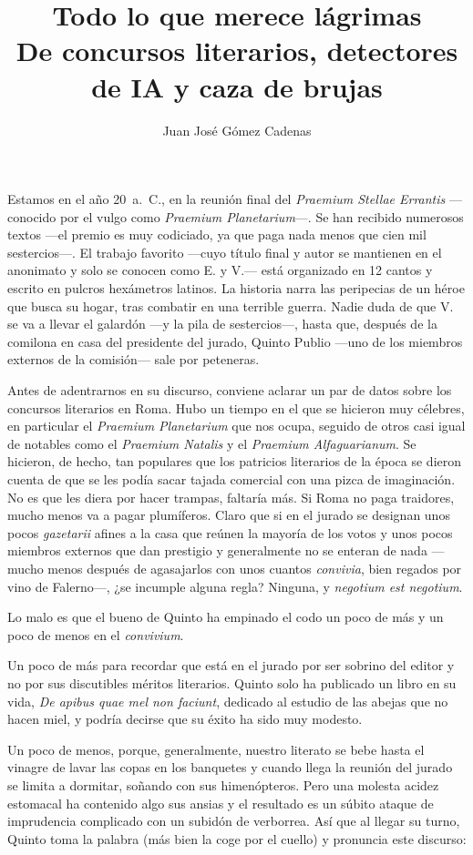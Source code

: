 \documentclass[11pt,a4paper]{article}
\title{Todo lo que merece lágrimas\\[0.4em]\large De concursos literarios, detectores de IA y caza de brujas}
\author{Juan José Gómez Cadenas}
\date{}
\begin{document}
\maketitle

Estamos en el año 20~a.~C., en la reunión final del \emph{Praemium Stellae Errantis} ---conocido por el vulgo como \emph{Praemium Planetarium}---. Se han recibido numerosos textos ---el premio es muy codiciado, ya que paga nada menos que cien mil sestercios---. El trabajo favorito ---cuyo título final y autor se mantienen en el anonimato y solo se conocen como E. y V.--- está organizado en 12 cantos y escrito en pulcros hexámetros latinos. La historia narra las peripecias de un héroe que busca su hogar, tras combatir en una terrible guerra. Nadie duda de que V. se va a llevar el galardón ---y la pila de sestercios---, hasta que, después de la comilona en casa del presidente del jurado, Quinto Publio ---uno de los miembros externos de la comisión--- sale por peteneras.

Antes de adentrarnos en su discurso, conviene aclarar un par de datos sobre los concursos literarios en Roma. Hubo un tiempo en el que se hicieron muy célebres, en particular el \emph{Praemium Planetarium} que nos ocupa, seguido de otros casi igual de notables como el \emph{Praemium Natalis} y el \emph{Praemium Alfaguarianum}. Se hicieron, de hecho, tan populares que los patricios literarios de la época se dieron cuenta de que se les podía sacar tajada comercial con una pizca de imaginación. No es que les diera por hacer trampas, faltaría más. Si Roma no paga traidores, mucho menos va a pagar plumíferos. Claro que si en el jurado se designan unos pocos \emph{gazetarii} afines a la casa que reúnen la mayoría de los votos y unos pocos miembros externos que dan prestigio y generalmente no se enteran de nada ---mucho menos después de agasajarlos con unos cuantos \emph{convivia}, bien regados por vino de Falerno---, ¿se incumple alguna regla? Ninguna, y \emph{negotium est negotium}.

Lo malo es que el bueno de Quinto ha empinado el codo un poco de más y un poco de menos en el \emph{convivium}.

Un poco de más para recordar que está en el jurado por ser sobrino del editor y no por sus discutibles méritos literarios.
Quinto solo ha publicado un libro en su vida, \emph{De apibus quae mel non faciunt}, dedicado al estudio de las abejas que no hacen miel, y podría decirse que su éxito ha sido muy modesto.

Un poco de menos, porque, generalmente, nuestro literato se bebe hasta el vinagre de lavar las copas en los banquetes y cuando llega la reunión del jurado se limita a dormitar, soñando con sus himenópteros. Pero una molesta acidez estomacal ha contenido algo sus ansias y el resultado es un súbito ataque de imprudencia complicado con un subidón de verborrea. Así que al llegar su turno, Quinto toma la palabra (más bien la coge por el cuello) y pronuncia este discurso:
\end{document}
